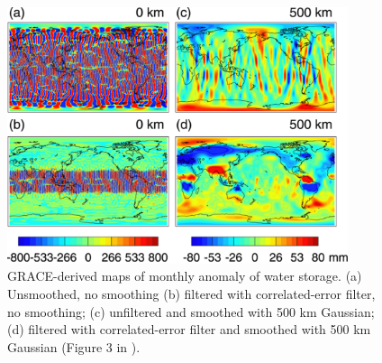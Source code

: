 \clearpage
\begin{figure}
	\centering
	\includegraphics[width=100mm]{figs_chpt2/Fig7.pdf}	
	\caption[GRACE-derived maps of monthly anomaly of water storage.]{GRACE-derived maps of monthly anomaly of water storage. (a) Unsmoothed, no smoothing (b) filtered with correlated-error filter, no smoothing; (c) unfiltered and smoothed with 500 km Gaussian; (d) filtered with correlated-error filter and smoothed with 500 km Gaussian  (Figure 3 in \citet{swenson2006chpt2}). }
	\label{fig:chpt2_fig7}
\end{figure}